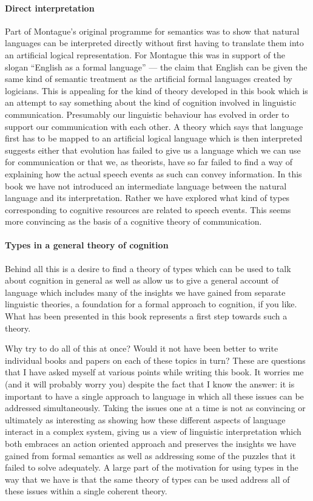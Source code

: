 \paragraph{Direct interpretation} Part of Montague's original
programme for semantics was to show that natural languages can be
interpreted directly without first having to translate them into an
artificial logical representation.  For Montague this was in support
of the slogan ``English as a formal language'' --- the claim that
English can be given the same kind of semantic treatment as the
artificial formal languages created by logicians.  This is appealing
for the kind of theory developed in this book which is an attempt to
say something about the kind of cognition involved in linguistic
communication.  Presumably our linguistic behaviour has evolved in
order to support our communication with each other.  A theory which
says that language first has to be mapped to an artificial logical
language which is then interpreted suggests either that evolution has
failed to give us a language which we can use for communication or
that we, as theorists, have so far failed to find a way of
explaining how the actual speech events as such can convey
information.  In this book we have not introduced an intermediate
language between the natural language and its interpretation.  Rather
we have explored what kind of types corresponding to cognitive
resources are related to speech events.  This seems more convincing as
the basis of a cognitive theory of communication. 
 
\paragraph{Types in a general theory of cognition}  Behind all this is a desire to find a theory of types which can be
used to talk about cognition in general as well as allow us to give a
general account of language which includes many of the insights we
have gained from separate linguistic theories, a foundation for a
formal approach to cognition, if you like.  What has been presented in
this book represents a first step towards such a theory.

Why try to do all of this at once?  Would it not have been better to
write individual books and papers on each of these topics in turn?
These are questions that I have asked myself at various points while
writing this book.  It worries me (and it will probably worry you)
despite the fact that I know the answer:  it is important to have a
single approach to language in which all these issues can be addressed
simultaneously.  Taking the issues one at a time is not as
convincing or ultimately as interesting as showing how these different
aspects of language interact in a complex system, giving us a view
of linguistic interpretation which both embraces an action oriented
approach and preserves the insights we have gained from formal
semantics as well as addressing some of the puzzles that it failed to
solve adequately.  A large part of the motivation for using types in
the way that we have is that the same theory of types can be used
address all of these issues within a single coherent theory.


